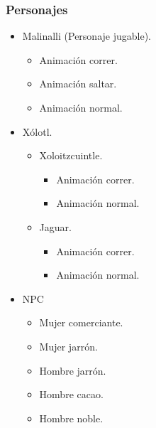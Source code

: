 \documentclass[11pt,letterpaper]{article}
\begin{document}
	\subsubsection{Personajes}
\begin{itemize}
\item Malinalli (Personaje jugable).
	\begin{itemize}
		\item Animación correr.
		\item Animación saltar. 
		\item Animación normal. 
	\end{itemize}	
\item Xólotl.
	\begin{itemize}
		\item Xoloitzcuintle.
			\begin{itemize}
				\item Animación correr.
				\item Animación normal. 
		\end{itemize}	
		\item Jaguar.
			\begin{itemize}
				\item Animación correr.
				\item Animación normal. 
		\end{itemize}	
	\end{itemize}	

\item NPC 
	\begin{itemize}
		\item Mujer comerciante.
		\item Mujer jarrón. 
		\item Hombre jarrón. 
		\item Hombre cacao.
		\item Hombre noble.
	\end{itemize}	 
\end{itemize}
\end{document}
